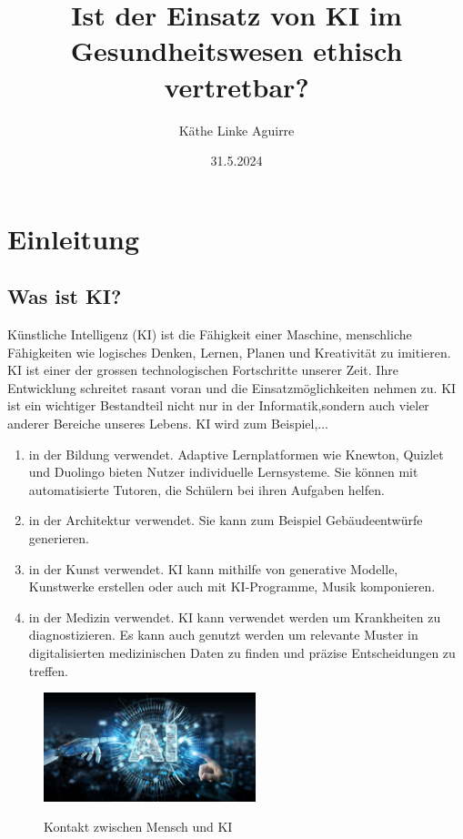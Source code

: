 \documentclass{report}
\title{Ist der Einsatz von KI im Gesundheitswesen ethisch vertretbar?}
\author{Käthe Linke Aguirre}
\date{31.5.2024}
\begin{document}
\maketitle


\tableofcontents

\chapter{Einleitung}

\section{Was ist KI?}
  
Künstliche Intelligenz (KI) ist die Fähigkeit einer Maschine, menschliche Fähigkeiten
wie logisches Denken, Lernen, Planen und Kreativität zu imitieren. KI ist einer der 
grossen technologischen Fortschritte unserer Zeit. Ihre Entwicklung schreitet 
rasant voran und die Einsatzmöglichkeiten nehmen zu. KI ist ein wichtiger Bestandteil nicht nur in der 
Informatik,sondern auch vieler anderer Bereiche unseres Lebens. 
\newline
KI wird zum Beispiel,... 
\begin{enumerate}
    \item in der Bildung verwendet. Adaptive Lernplatformen wie Knewton, Quizlet und Duolingo
    bieten Nutzer individuelle Lernsysteme. Sie können mit automatisierte Tutoren, die Schülern bei 
    ihren Aufgaben helfen.
    \item in der Architektur verwendet. Sie kann zum Beispiel Gebäudeentwürfe generieren.
    \item in der Kunst verwendet. KI kann mithilfe von generative Modelle, Kunstwerke erstellen oder 
    auch mit KI-Programme, Musik komponieren.
    \item in der Medizin verwendet. KI kann verwendet werden um Krankheiten zu diagnostizieren. 
    Es kann auch genutzt werden um relevante Muster in digitalisierten medizinischen 
    Daten zu finden und präzise Entscheidungen zu treffen.
\end{enumerate}

\begin{figure}
    \centering
    \includegraphics[width=0.55\textwidth]{R.jpg}
    \label{fig:R}
    \caption{Kontakt zwischen Mensch und KI}
\end{figure}
\end{document}
